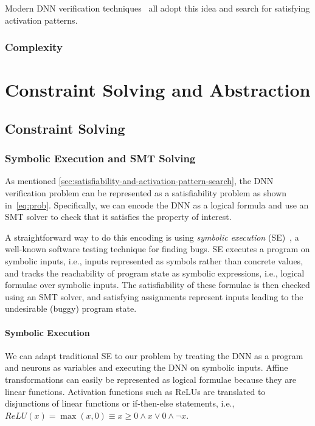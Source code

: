 \documentclass[oneside,11pt,dvipsnames]{book}
\begin{document}
Modern DNN verification techniques~\cite{bunel2020branch,wang2021beta,ferrari2022complete,duong2024harnessing,duong2023dpllt,ovalbab,katz2019marabou,bak2021nnenum} all adopt this idea and search for satisfying activation patterns.


\section{Complexity}



\part{Constraint Solving and Abstraction}


\chapter{Constraint Solving}


\section{Symbolic Execution and SMT Solving}\label{sec:se-smt}

As mentioned \autoref{sec:satisfiability-and-activation-pattern-search}, the DNN verification problem can be represented as a satisfiability problem as shown in~\autoref{eq:prob}.  Specifically, we can encode the DNN as a logical formula and use an SMT solver to check that it satisfies the property of interest.

A straightforward way to do this encoding is using \emph{symbolic execution} (SE)~\cite{FIXME}, a well-known software testing technique for finding bugs.  SE executes a program on symbolic inputs, i.e., inputs represented as symbols rather than concrete values, and tracks the reachability of program state as symbolic expressions, i.e., logical formulae over symbolic inputs. The satisfiability of these formulae is then checked using an SMT solver, and satisfying assignments represent inputs leading to the undesirable (buggy) program state.

\subsection{Symbolic Execution}\label{sec:se}
We can adapt traditional SE to our problem by treating the DNN as a program and neurons as variables and executing the DNN on symbolic inputs. Affine transformations can easily be represented as logical formulae because they are linear functions. Activation functions such as ReLUs are translated to disjunctions of linear functions or if-then-else statements, i.e., $ReLU(x) = \max(x,0) \equiv x \ge 0 \land x \lor 0 \land \neg x$.
\end{document}
